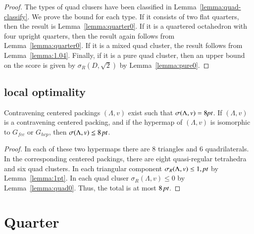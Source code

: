 \begin{proof}
The types of quad clusers have been classified in Lemma~\ref{lemma:quad-classify}.
We prove the bound for each type.
If it consists of two flat quarters, then the result is
Lemma~\ref{lemma:quarter0}.  If it is a quartered octahedron with
four upright quarters, then the result again follows from
Lemma~\ref{lemma:quarter0}.  If it is a mixed quad cluster,
the result follows from Lemma~\ref{lemma:1.04}.  Finally,
if it is a pure quad cluster, then an upper bound on the score
is given by $\sigma_R(D,\sqrt2)$ by Lemma~\ref{lemma:pure0}.  
\end{proof}







\subsection{local optimality}%
\label{sec:local-opt}

\begin{lemma}  %
Contravening centered packings $(\Lambda,v)$ exist such that
$\sigma(\Lambda,v)=8\hbox{\it pt}$. If $(\Lambda,v)$ is a contravening centered packing, and
if the hypermap of $(\Lambda,v)$ is isomorphic to $G_{fcc}$ or $G_{hcp}$,
then $\sigma(\Lambda,v) \le 8\,\hbox{\it pt}$.
\end{lemma} %

\begin{proof}
In each of these two hypermaps there are $8$ triangles and
$6$ quadrilaterals.  In the corresponding centered packings,
there are  eight quasi-regular tetrahedra and six quad clusters.
In each triangular component $\sigma_R(\Lambda,v)\le 1,\hbox{\it pt}$ by Lemma~\ref{lemma:1pt}.
In each quad cluser $\sigma_R(\Lambda,v)\le 0$ by Lemma~\ref{lemma:quad0}.  
Thus, the total is
at most $8\,\hbox{\it pt}$.
\end{proof}













\section{Quarter} %
    \label{sec:upright}


